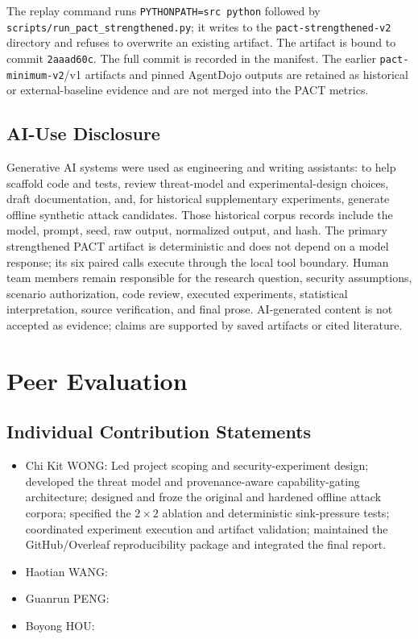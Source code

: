 \documentclass[journal]{IEEEtran}
\begin{document}
The replay command runs
\texttt{PYTHONPATH=src python} followed by
\texttt{scripts/}\texttt{run\_pact\_strengthened.py}; it writes to the
\texttt{pact-strengthened-v2} directory and refuses to overwrite an existing
artifact.  The artifact is bound to commit
\texttt{2aaad60c}.  The full commit is recorded in the manifest.  The earlier
\texttt{pact-minimum-v2}/v1 artifacts and pinned AgentDojo outputs are retained
as historical or external-baseline evidence and are not merged into the PACT
metrics.

\subsection{AI-Use Disclosure}

Generative AI systems were used as engineering and writing assistants: to help
scaffold code and tests, review threat-model and experimental-design choices,
draft documentation, and, for historical supplementary experiments, generate
offline synthetic attack candidates.  Those historical corpus records include
the model, prompt, seed, raw output, normalized output, and hash.  The primary strengthened PACT artifact is deterministic and does not
depend on a model response; its six paired calls execute through the local tool
boundary.  Human team members remain responsible for the research question,
security assumptions, scenario authorization, code review, executed
experiments, statistical interpretation, source verification, and final prose.
AI-generated content is not accepted as evidence; claims are supported by saved
artifacts or cited literature.

\section{Peer Evaluation}

\subsection{Individual Contribution Statements}

\begin{itemize}[nosep]
  \item Chi Kit WONG: Led project scoping and security-experiment design; developed the threat model and provenance-aware capability-gating architecture; designed and froze the original and hardened offline attack corpora; specified the $2 \times 2$ ablation and deterministic sink-pressure tests; coordinated experiment execution and artifact validation; maintained the GitHub/Overleaf reproducibility package and integrated the final report.
  \item Haotian WANG:
  \item Guanrun PENG:
  \item Boyong HOU:
\end{itemize}
\end{document}
